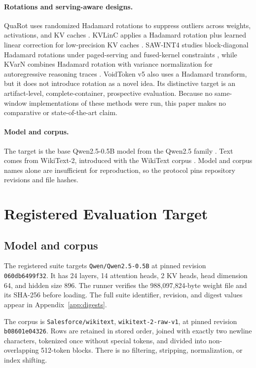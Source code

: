 \documentclass[10pt,twocolumn]{article}
\begin{document}
\paragraph{Rotations and serving-aware designs.}
QuaRot uses randomized Hadamard rotations to suppress outliers across weights,
activations, and KV caches \cite{ashkboos2024quarot}. KVLinC applies a
Hadamard rotation plus learned linear correction for low-precision KV caches
\cite{saxena2025kvlinc}. SAW-INT4 studies block-diagonal Hadamard rotations
under paged-serving and fused-kernel constraints \cite{jia2026saw}, while
KVarN combines Hadamard rotation with variance normalization for
autoregressive reasoning traces \cite{muller2026kvarn}. VoidToken v5 also uses
a Hadamard transform, but it does not introduce rotation as a novel idea. Its
distinctive target is an artifact-level, complete-container, prospective
evaluation. Because no same-window implementations of these methods were run,
this paper makes no comparative or state-of-the-art claim.

\paragraph{Model and corpus.}
The target is the base Qwen2.5-0.5B model from the Qwen2.5 family
\cite{qwen25}. Text comes from WikiText-2, introduced with the WikiText corpus
\cite{merity2016wikitext}. Model and corpus names alone are insufficient for
reproduction, so the protocol pins repository revisions and file hashes.

\section{Registered Evaluation Target}
\label{sec:target}

\subsection{Model and corpus}

The registered suite targets \texttt{Qwen/Qwen2.5-0.5B} at pinned revision
\texttt{060db6499f32}. It has 24 layers, 14 attention heads, 2 KV heads, head
dimension 64, and hidden size 896. The runner verifies the 988,097,824-byte
weight file and its SHA-256 before loading. The full suite identifier, revision,
and digest values appear in Appendix~\ref{app:digests}.

The corpus is \texttt{Salesforce/wikitext},
\texttt{wikitext-2-raw-v1}, at pinned revision \texttt{b08601e04326}.
Rows are retained in stored order, joined with exactly two newline characters,
tokenized once without special tokens, and divided into non-overlapping
512-token blocks. There is no filtering, stripping, normalization, or index
shifting.
\end{document}
